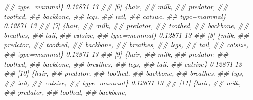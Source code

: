 \documentclass[
  notitlepage]{book}
\newenvironment{Shaded}{\begin{snugshade}}{\end{snugshade}}
\newcommand{\CommentTok}[1]{\textcolor[rgb]{0.56,0.35,0.01}{\textit{#1}}}
\begin{document}
\begin{Shaded}
\begin{Highlighting}[]
\CommentTok{\#\#       type=mammal\} 0.12871    13}
\CommentTok{\#\# [6]  \{hair,                     }
\CommentTok{\#\#       milk,                     }
\CommentTok{\#\#       predator,                 }
\CommentTok{\#\#       toothed,                  }
\CommentTok{\#\#       backbone,                 }
\CommentTok{\#\#       legs,                     }
\CommentTok{\#\#       tail,                     }
\CommentTok{\#\#       catsize,                  }
\CommentTok{\#\#       type=mammal\} 0.12871    13}
\CommentTok{\#\# [7]  \{hair,                     }
\CommentTok{\#\#       milk,                     }
\CommentTok{\#\#       predator,                 }
\CommentTok{\#\#       toothed,                  }
\CommentTok{\#\#       backbone,                 }
\CommentTok{\#\#       breathes,                 }
\CommentTok{\#\#       tail,                     }
\CommentTok{\#\#       catsize,                  }
\CommentTok{\#\#       type=mammal\} 0.12871    13}
\CommentTok{\#\# [8]  \{milk,                     }
\CommentTok{\#\#       predator,                 }
\CommentTok{\#\#       toothed,                  }
\CommentTok{\#\#       backbone,                 }
\CommentTok{\#\#       breathes,                 }
\CommentTok{\#\#       legs,                     }
\CommentTok{\#\#       tail,                     }
\CommentTok{\#\#       catsize,                  }
\CommentTok{\#\#       type=mammal\} 0.12871    13}
\CommentTok{\#\# [9]  \{hair,                     }
\CommentTok{\#\#       milk,                     }
\CommentTok{\#\#       predator,                 }
\CommentTok{\#\#       toothed,                  }
\CommentTok{\#\#       backbone,                 }
\CommentTok{\#\#       breathes,                 }
\CommentTok{\#\#       legs,                     }
\CommentTok{\#\#       tail,                     }
\CommentTok{\#\#       catsize\}     0.12871    13}
\CommentTok{\#\# [10] \{hair,                     }
\CommentTok{\#\#       predator,                 }
\CommentTok{\#\#       toothed,                  }
\CommentTok{\#\#       backbone,                 }
\CommentTok{\#\#       breathes,                 }
\CommentTok{\#\#       legs,                     }
\CommentTok{\#\#       tail,                     }
\CommentTok{\#\#       catsize,                  }
\CommentTok{\#\#       type=mammal\} 0.12871    13}
\CommentTok{\#\# [11] \{hair,                     }
\CommentTok{\#\#       milk,                     }
\CommentTok{\#\#       predator,                 }
\CommentTok{\#\#       toothed,                  }
\CommentTok{\#\#       backbone,                 }

\end{Highlighting}
\end{Shaded}
\end{document}
